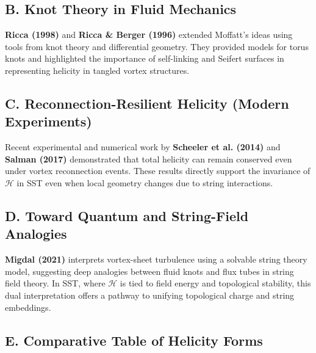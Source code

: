 \documentclass[aps,prb,amsmath,amssymb]{revtex4-2} %
\newcommand{\Hcal}{\mathcal{H}}         %
\begin{document}
        \subsection*{B. Knot Theory in Fluid Mechanics}
            \textbf{Ricca (1998)} and \textbf{Ricca \& Berger (1996)} extended Moffatt's ideas using tools from knot theory and differential geometry. They provided models for torus knots and highlighted the importance of self-linking and Seifert surfaces in representing helicity in tangled vortex structures.

        \subsection*{C. Reconnection-Resilient Helicity (Modern Experiments)}
            Recent experimental and numerical work by \textbf{Scheeler et al. (2014)} and \textbf{Salman (2017)} demonstrated that total helicity can remain conserved even under vortex reconnection events. These results directly support the invariance of $\Hcal$ in SST even when local geometry changes due to string interactions.

        \subsection*{D. Toward Quantum and String-Field Analogies}
            \textbf{Migdal (2021)} interprets vortex-sheet turbulence using a solvable string theory model, suggesting deep analogies between fluid knots and flux tubes in string field theory. In SST, where $\Hcal$ is tied to field energy and topological stability, this dual interpretation offers a pathway to unifying topological charge and string embeddings.

        \subsection*{E. Comparative Table of Helicity Forms}
\end{document}
